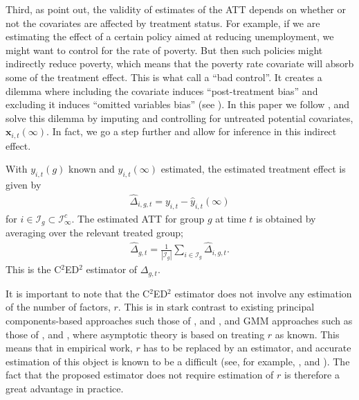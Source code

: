 \documentclass[12pt,fleqn]{article}
\def\*#1{\mathbf{#1}}
\begin{document}
Third, as \citet{Caetano_Callaway_Payne_Rodrigues_2022} point out, the validity of estimates of the ATT depends on whether or not the covariates are affected by treatment status. For example, if we are estimating the effect of a certain policy aimed at reducing unemployment, we might want to control for the rate of poverty. But then such policies might indirectly reduce poverty, which means that the poverty rate covariate will absorb some of the treatment effect. This is what \citet{angrist2009mostly} call a ``bad control''. It creates a dilemma where including the covariate induces ``post-treatment bias'' and excluding it induces ``omitted variables bias'' (see \citealp{aklin2017can}). In this paper we follow \citet{Caetano_Callaway_Payne_Rodrigues_2022}, and solve this dilemma by imputing and controlling for untreated potential covariates, $\*x_{i,t}(\infty)$. In fact, we go a step further and allow for inference in this indirect effect. 

With $y_{i,t}(g)$ known and $y_{i,t}(\infty)$ estimated, the estimated treatment effect is given by
\begin{align}
\widehat \Delta_{i,g,t} = y_{i,t} - \widehat y_{i,t}(\infty)  \label{theat}
\end{align}
for $i \in \mathcal{I}_g \subset \mathcal{I}_\infty^c$. The estimated ATT for group $g$ at time $t$ is obtained by averaging over the relevant treated group;
\begin{align}
\widehat \Delta_{g,t} = \frac{1}{|\mathcal{I}_g|}\sum_{i \in \mathcal{I}_g} \widehat \Delta_{i,g,t}. \label{atthat}
\end{align}
This is the C$^2$ED$^2$ estimator of $\Delta_{g,t}$.

It is important to note that the C$^2$ED$^2$ estimator does not involve any estimation of the number of factors, $r$. This is in stark contrast to existing principal components-based approaches such those of \citet{chan2022pcdid}, and \citet{Xu_2017}, and GMM approaches such as those of \citet{Callaway_Karami_2020}, and \citet{brown2022generalized}, where asymptotic theory is based on treating $r$ as known. This means that in empirical work, $r$ has to be replaced by an estimator, and accurate estimation of this object is known to be a difficult (see, for example, \citealp{moon2015linear}, and \citealp{breitung2021alternative}). The fact that the proposed estimator does not require estimation of $r$ is therefore a great advantage in practice.
\end{document}
